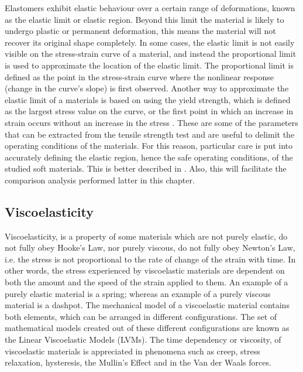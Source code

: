 Elastomers exhibit elastic behaviour over a certain range of deformations, known as the elastic limit or elastic region. Beyond this limit the material is likely to undergo plastic or permanent deformation, this means the material will not recover its original shape completely. In some cases, the elastic limit is not easily visible on the stress-strain curve of a material, and instead the proportional limit is used to approximate the location of the elastic limit. The proportional limit is defined as the point in the stress-strain curve where the nonlinear response (change in the curve's slope) is first observed. Another way to approximate the elastic limit of a materials is based on using the yield strength, which is defined as the largest stress value on the curve, or the first point in which an increase in strain occurs without an increase in the stress \cite{ebewele2000}. These are some of the parameters that can be extracted from the tensile strength test and are useful to delimit the operating conditions of the materials. For this reason, particular care is put into accurately defining the elastic region, hence the safe operating conditions, of the studied soft materials. This is better described in . Also, this will facilitate the comparison analysis performed latter in this chapter.

\subsection{Viscoelasticity}

Viscoelasticity, is a property of some materials which are not purely elastic, do not fully obey Hooke's Law, nor purely viscous, do not fully obey Newton's Law, i.e. the stress is not proportional to the rate of change of the strain with time. In other words, the stress experienced by viscoelastic materials are dependent on both the amount and the speed of the strain applied to them. An example of a purely elastic material is a spring; whereas an example of a purely viscous material is a dashpot. The mechanical model of a viscoelastic material contains both elements, which can be arranged in different configurations. The set of mathematical models created out of these different configurations are known as the Linear Viscoelastic Models (LVMs). The time dependency or viscosity, of viscoelastic materials is appreciated in phenomena such as creep, stress relaxation, hysteresis, the Mullin's Effect and in the Van der Waals forces.

